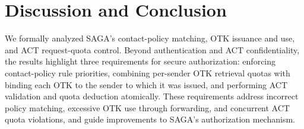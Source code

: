 
\section{Discussion and Conclusion}
\label{sec:discussion-conclusion}

We formally analyzed SAGA's contact-policy matching, OTK issuance and use, and ACT request-quota control. Beyond authentication and ACT confidentiality, the results highlight three requirements for secure authorization: enforcing contact-policy rule priorities, combining per-sender OTK retrieval quotas with binding each OTK to the sender to which it was issued, and performing ACT validation and quota deduction atomically. These requirements address incorrect policy matching, excessive OTK use through forwarding, and concurrent ACT quota violations, and guide improvements to SAGA's authorization mechanism.
